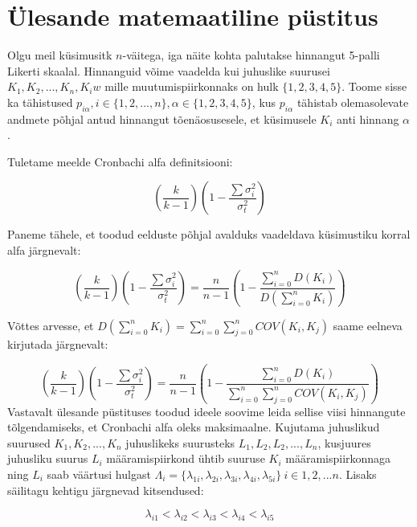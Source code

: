 \documentclass[a4paper]{article}
\begin{document}
\section*{\"Ulesande matemaatiline p\"ustitus}

Olgu meil k\"usimusitk $n$-väitega, iga näite kohta palutakse hinnangut 5-palli Likerti skaalal. Hinnanguid võime vaadelda kui  juhuslike suurusei $K_1,K_2,...,K_n, K_iw$ mille muutumispiirkonnaks on hulk $\{1,2,3,4,5\}$. Toome sisse ka tähistused $p_{i \alpha}, i \in \{1,2,...,n\}, \alpha \in \{1,2,3,4,5\}$, kus $p_{i \alpha}$ tähistab olemasolevate andmete põhjal antud hinnangut tõenäosusesele, et k\"usimusele $K_i$ anti hinnang $\alpha$. 

Tuletame meelde Cronbachi alfa definitsiooni:


\begin{equation*}
(\frac{k}{k-1})( 1 - \frac{\sum \sigma_i^2}{\sigma_t^2})
\end{equation*}

Paneme tähele, et toodud eelduste põhjal avalduks vaadeldava k\"usimustiku korral alfa järgnevalt:

 
\begin{equation*}
(\frac{k}{k-1})( 1 - \frac{\sum \sigma_i^2}{\sigma_t^2}) = \frac{n}{n-1}\left(1 - \frac
{\sum \limits_{i=0}^n D(K_i)}{D(\sum \limits_{i=0}^n K_i)}\right)
\end{equation*}

Võttes arvesse, et $D(\sum \limits_{i=0}^n K_i) = \sum \limits_{i=0}^n \sum \limits_{j=0}^n COV(K_i,K_j)$ saame eelneva kirjutada järgnevalt:

\begin{equation*}
(\frac{k}{k-1})( 1 - \frac{\sum \sigma_i^2}{\sigma_t^2}) = \frac{n}{n-1}\left(1 - \frac
{\sum \limits_{i=0}^n D(K_i)}{\sum \limits_{i=0}^n \sum \limits_{j=0}^n COV(K_i,K_j)}\right)
\end{equation*}
Vastavalt \"ulesande p\"ustituses toodud ideele soovime leida sellise viisi hinnangute tõlgendamiseks, et Cronbachi alfa oleks maksimaalne. Kujutama juhuslikud suurused $K_1,K_2,...,K_n$ juhuslikeks suurusteks $L_1, L_2,L_2,...,L_n$, kusjuures juhusliku suurus $L_i$ määramispiirkond \"uhtib suuruse $K_i$ määramispiirkonnaga ning $L_i$ saab väärtusi hulgast $\Lambda_i = \{\lambda_{1i},\lambda_{2i},\lambda_{3i},\lambda_{4i},\lambda_{5i}\} ~ i \in {1,2,...n}$. Lisaks säilitagu  kehtigu järgnevad kitsendused: 


\begin{equation*}
\lambda_{i1} < \lambda_{i2}  < \lambda_{i3} < \lambda_{i4} < \lambda_{i5}
\end{equation*}
\end{document}
